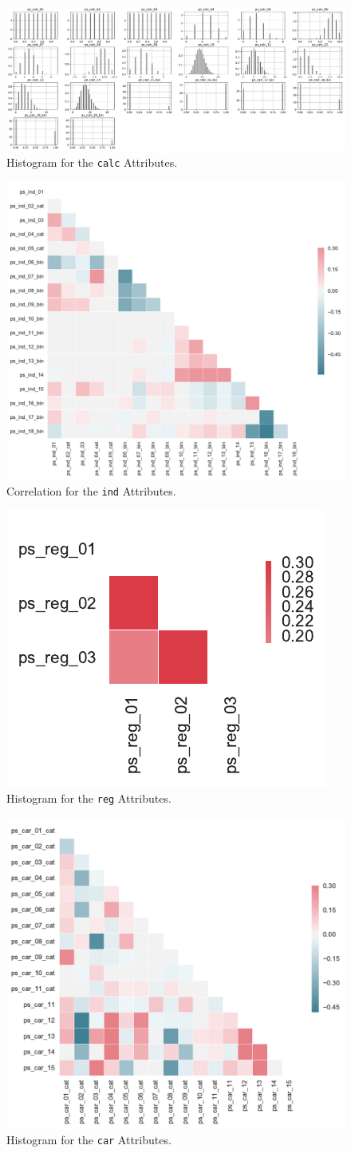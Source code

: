 \documentclass{standalone}
\begin{document}
\begin{figure}[!t]
\centering
\includegraphics[width=\textwidth]{fig/calc_col.pdf}
\caption{Histogram for the \lstinline{calc} Attributes.}
\label{fig_calc}
\end{figure}

\begin{figure}[!t]
\centering
\includegraphics[width=.5\textwidth]{fig/corr_ind_col.pdf}
\caption{Correlation for the \lstinline{ind} Attributes.}
\label{hist_ind}
\end{figure}

\begin{figure}[!t]
\centering
\includegraphics[width=.2\textwidth]{fig/corr_reg_col.pdf}
\caption{Histogram for the \lstinline{reg} Attributes.}
\label{fig_reg}
\end{figure}

\begin{figure}[!t]
\centering
\includegraphics[width=.5\textwidth]{fig/corr_car_col.pdf}
\caption{Histogram for the \lstinline{car} Attributes.}
\label{fig_car}
\end{figure}
\end{document}
